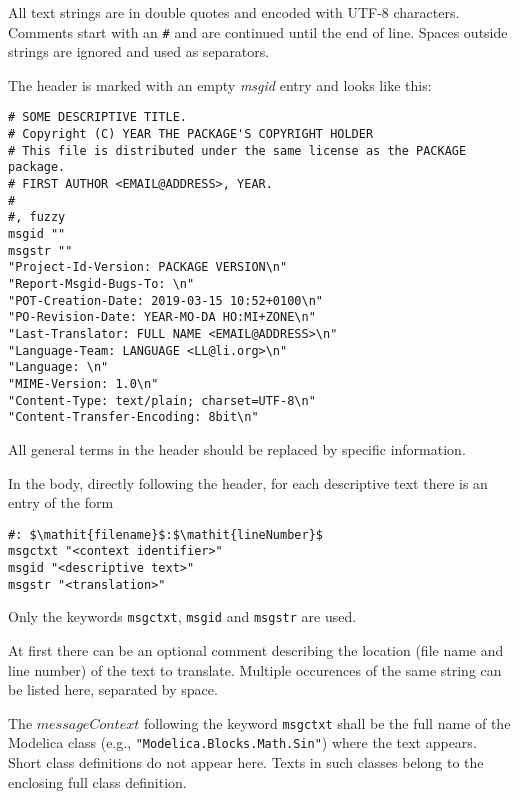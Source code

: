 \begin{nonnormative}
All text strings are in double quotes and encoded with UTF-8 characters.
Comments start with an \lstinline!#! and are continued until the end of line.
Spaces outside strings are ignored and used as separators.

The header is marked with an empty \emph{msgid} entry and looks like this:
\begin{lstlisting}
# SOME DESCRIPTIVE TITLE.
# Copyright (C) YEAR THE PACKAGE'S COPYRIGHT HOLDER
# This file is distributed under the same license as the PACKAGE package.
# FIRST AUTHOR <EMAIL@ADDRESS>, YEAR.
#
#, fuzzy
msgid ""
msgstr ""
"Project-Id-Version: PACKAGE VERSION\n"
"Report-Msgid-Bugs-To: \n"
"POT-Creation-Date: 2019-03-15 10:52+0100\n"
"PO-Revision-Date: YEAR-MO-DA HO:MI+ZONE\n"
"Last-Translator: FULL NAME <EMAIL@ADDRESS>\n"
"Language-Team: LANGUAGE <LL@li.org>\n"
"Language: \n"
"MIME-Version: 1.0\n"
"Content-Type: text/plain; charset=UTF-8\n"
"Content-Transfer-Encoding: 8bit\n"
\end{lstlisting}
All general terms in the header should be replaced by specific information.

In the body, directly following the header, for each descriptive text there is an entry of the form
\begin{lstlisting}
#: $\mathit{filename}$:$\mathit{lineNumber}$
msgctxt "<context identifier>"
msgid "<descriptive text>"
msgstr "<translation>"
\end{lstlisting}
\end{nonnormative}

Only the keywords \lstinline!msgctxt!, \lstinline!msgid! and \lstinline!msgstr! are used.

\begin{nonnormative}
At first there can be an optional comment describing the location (file name and line number) of the text to translate.
Multiple occurences of the same string can be listed here, separated by space.
\end{nonnormative}

The $\mathit{messageContext}$ following the keyword \lstinline!msgctxt! shall be the full name of the Modelica class (e.g., \lstinline!"Modelica.Blocks.Math.Sin"!) where the text appears.
Short class definitions do not appear here.
Texts in such classes belong to the enclosing full class definition.

